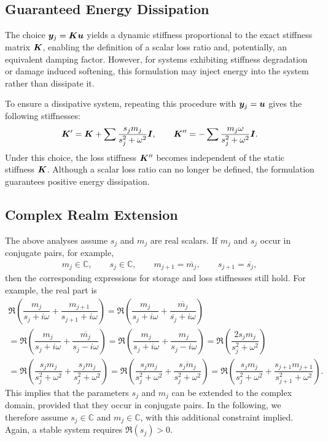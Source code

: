 \subsection{Guaranteed Energy Dissipation}
The choice $\bm{y}_j=\bm{K}\bm{u}$ yields a dynamic stiffness proportional to the exact stiffness matrix $\bm{K}$, enabling the definition of a scalar loss ratio and, potentially, an equivalent damping factor.
However, for systems exhibiting stiffness degradation or damage induced softening, this formulation may inject energy into the system rather than dissipate it.

To ensure a dissipative system, repeating this procedure with $\bm{y}_j=\bm{u}$ gives the following stiffnesses:
\begin{gather}
    \bm{K}'=\bm{K}+\sum\dfrac{s_jm_j}{s_j^2+\omega^2}\bm{I},\qquad
    \bm{K}''=-\sum\dfrac{m_j\omega}{s_j^2+\omega^2}\bm{I}.
\end{gather}
Under this choice, the loss stiffness $\bm{K}''$ becomes independent of the static stiffness $\bm{K}$.
Although a scalar loss ratio can no longer be defined, the formulation guarantees positive energy dissipation.
\subsection{Complex Realm Extension}
The above analyses assume $s_j$ and $m_j$ are real scalars.
If $m_j$ and $s_j$ occur in conjugate pairs, for example,
\begin{gather}
    \boxed{
    m_j\in\mathbb{C},\qquad
    s_j\in\mathbb{C},\qquad
    m_{j+1}=\overline{m_j},\qquad
    s_{j+1}=\overline{s_j},}
\end{gather}
then the corresponding expressions for storage and loss stiffnesses still hold.
For example, the real part is
\begin{multline}
\Re\left(\dfrac{m_j}{s_j+i\omega}+\dfrac{m_{j+1}}{s_{j+1}+i\omega}\right)
=\Re\left(\dfrac{m_j}{s_j+i\omega}+\dfrac{\overline{m_j}}{\overline{s_j}+i\omega}\right)
\\=\Re\left(\dfrac{m_j}{s_j+i\omega}+\overline{\dfrac{m_j}{s_j-i\omega}}\right)
=\Re\left(\dfrac{m_j}{s_j+i\omega}+\dfrac{m_j}{s_j-i\omega}\right)
=\Re\left(\dfrac{2s_jm_j}{s^2_j+\omega^2}\right)
\\=\Re\left(\dfrac{s_jm_j}{s_j^2+\omega^2}+\dfrac{s_jm_j}{s_j^2+\omega^2}\right)
=\Re\left(\dfrac{s_jm_j}{s_j^2+\omega^2}+\overline{\dfrac{s_jm_j}{s_j^2+\omega^2}}\right)
=\Re\left(\dfrac{s_jm_j}{s_j^2+\omega^2}+\dfrac{s_{j+1}m_{j+1}}{s_{j+1}^2+\omega^2}\right).
\end{multline}
This implies that the parameters $s_j$ and $m_j$ can be extended to the complex domain, provided that they occur in conjugate pairs.
In the following, we therefore assume $s_j\in\mathbb{C}$ and $m_j\in\mathbb{C}$, with this additional constraint implied.
Again, a stable system requires $\Re\left(s_j\right)>0$.
